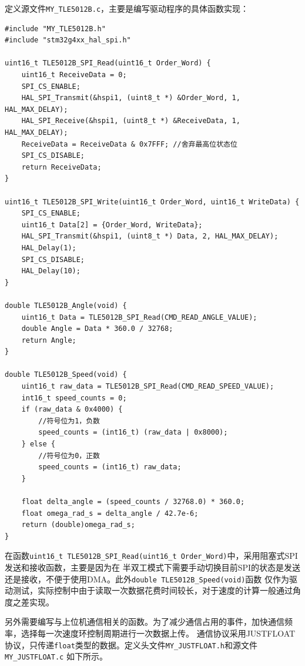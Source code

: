 定义源文件\texttt{MY\_TLE5012B.c}，主要是编写驱动程序的具体函数实现：

\begin{lstlisting}
#include "MY_TLE5012B.h"
#include "stm32g4xx_hal_spi.h"

uint16_t TLE5012B_SPI_Read(uint16_t Order_Word) {
    uint16_t ReceiveData = 0;
    SPI_CS_ENABLE;
    HAL_SPI_Transmit(&hspi1, (uint8_t *) &Order_Word, 1, HAL_MAX_DELAY);
    HAL_SPI_Receive(&hspi1, (uint8_t *) &ReceiveData, 1, HAL_MAX_DELAY);
    ReceiveData = ReceiveData & 0x7FFF; //舍弃最高位状态位
    SPI_CS_DISABLE;
    return ReceiveData;
}

uint16_t TLE5012B_SPI_Write(uint16_t Order_Word, uint16_t WriteData) {
    SPI_CS_ENABLE;
    uint16_t Data[2] = {Order_Word, WriteData};
    HAL_SPI_Transmit(&hspi1, (uint8_t *) Data, 2, HAL_MAX_DELAY);
    HAL_Delay(1);
    SPI_CS_DISABLE;
    HAL_Delay(10);
}

double TLE5012B_Angle(void) {
    uint16_t Data = TLE5012B_SPI_Read(CMD_READ_ANGLE_VALUE);
    double Angle = Data * 360.0 / 32768;
    return Angle;
}

double TLE5012B_Speed(void) {
    uint16_t raw_data = TLE5012B_SPI_Read(CMD_READ_SPEED_VALUE);
    int16_t speed_counts = 0;
    if (raw_data & 0x4000) {
        //符号位为1，负数
        speed_counts = (int16_t) (raw_data | 0x8000);
    } else {
        //符号位为0，正数
        speed_counts = (int16_t) raw_data;
    }

    float delta_angle = (speed_counts / 32768.0) * 360.0;
    float omega_rad_s = delta_angle / 42.7e-6;
    return (double)omega_rad_s;
}

\end{lstlisting}

在函数\texttt{uint16\_t TLE5012B\_SPI\_Read(uint16\_t Order\_Word)}中，采用阻塞式SPI发送和接收函数，主要是因为在
半双工模式下需要手动切换目前SPI的状态是发送还是接收，不便于使用DMA。此外\texttt{double TLE5012B\_Speed(void)}函数
仅作为驱动测试，实际控制中由于读取一次数据花费时间较长，对于速度的计算一般通过角度之差实现。

另外需要编写与上位机通信相关的函数。为了减少通信占用的事件，加快通信频率，选择每一次速度环控制周期进行一次数据上传。
通信协议采用JUSTFLOAT协议，只传递\texttt{float}类型的数据。定义头文件\texttt{MY\_JUSTFLOAT.h}和源文件\texttt{MY\_JUSTFLOAT.c}
如下所示。

